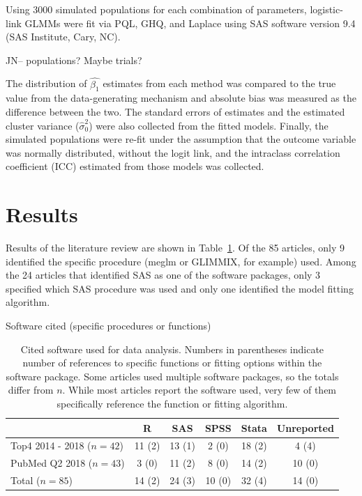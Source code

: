 \documentclass{article}
\begin{document}
\begin{flushleft}
Using 3000 simulated populations for each combination of parameters, logistic-link GLMMs were fit via PQL, GHQ, and Laplace using SAS software version 9.4 (SAS Institute, Cary, NC).

JN-- populations?  Maybe trials?

The distribution of $\hat{\beta_1}$ estimates from each method was compared to the true value from the data-generating mechanism and absolute bias was measured as the difference between the two. The standard errors of estimates and the estimated cluster variance ($\hat{\sigma}^2_0$) were also collected from the fitted models. Finally, the simulated populations were re-fit under the assumption that the outcome variable was normally distributed, without the logit link, and the intraclass correlation coefficient (ICC) estimated from those models was collected.




\section{Results}

Results of the literature review are shown in Table~\ref{tab:lit_review}. Of the 85 articles, only 9 identified the specific procedure (meglm or GLIMMIX, for example) used. Among the 24 articles that identified SAS as one of the software packages, only 3 specified which SAS procedure was used and only one identified the model fitting algorithm.

\begin{table}[]
\centering
Software cited (specific procedures or functions)
 \begin{tabular}{ |l||c|c|c|c|c| } 
 \hline
      & R & SAS & SPSS & Stata & Unreported\\ 
     \hline
    Top4 2014 - 2018 ($n=42$) & 11 (2) & 13 (1) & 2 (0) & 18 (2) & 4 (4)  \\ 
    PubMed Q2 2018 ($n=43$) & 3 (0) & 11 (2) & 8 (0) & 14 (2) & 10 (0) \\ 
    \hline
    Total ($n=85$) & 14 (2) & 24 (3) & 10 (0) & 32 (4) & 14 (0) \\ 
\hline
 \end{tabular}
    \caption{Cited software used for data analysis. Numbers in parentheses indicate number of references to specific functions or fitting options within the software package. Some articles used multiple software packages, so the totals differ from $n$. While most articles report the software used, very few of them specifically reference the function or fitting algorithm.}
    \label{tab:lit_review}
\end{table}


\end{flushleft}
\end{document}
